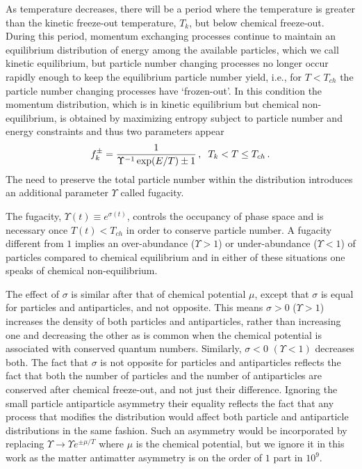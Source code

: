 As temperature decreases, there will be a period where the temperature is greater than the kinetic freeze-out temperature, $T_k$, but below chemical freeze-out. During this period, momentum exchanging processes continue to maintain an equilibrium distribution of energy among the available particles, which we call kinetic equilibrium, but particle number changing processes no longer occur rapidly enough to keep the equilibrium particle number yield, i.e., for $T<T_{ch}$ the particle number changing processes have `frozen-out'. In this condition the momentum distribution, which is in kinetic equilibrium but chemical non-equilibrium, is obtained by maximizing  entropy subject to  particle number and energy constraints and thus two parameters appear
\begin{equation}\label{k_eq}
f_{k}^\pm=\frac{1}{\Upsilon^{-1} \exp(E/T)\pm 1}\,,\hspace{2mm} T_k<T\leq T_{ch}\,.
\end{equation}
The need to preserve the total particle number within the distribution introduces an additional parameter $\Upsilon$ called fugacity. 

The fugacity, $\Upsilon(t)\equiv e^{\sigma(t)}$, controls the occupancy of phase space and is necessary once $T(t)<T_{ch}$ in order to conserve particle number.  A fugacity different from $1$ implies an over-abundance ($\Upsilon>1$) or under-abundance ($\Upsilon<1$) of particles compared to chemical equilibrium and in either of these  situations one speaks of chemical non-equilibrium. 

The effect of $\sigma$ is similar after that of chemical potential $\mu$, except that $\sigma$ is equal for particles and antiparticles, and not opposite. This means $\sigma>0$ ($\Upsilon>1$) increases the density of both particles and antiparticles, rather than increasing one and decreasing the other as is common when the chemical potential is associated with conserved quantum numbers.  Similarly, $\sigma<0$ $(\Upsilon<1)$ decreases both. The fact that $\sigma$ is not opposite for particles and antiparticles reflects the fact that both  the number of particles and the number of antiparticles are conserved after chemical freeze-out, and not just their difference.  Ignoring the small particle antiparticle asymmetry their equality reflects the fact that any process that modifies  the distribution would affect both particle and antiparticle distributions in the same fashion.   Such an asymmetry would be incorporated by replacing $\Upsilon\rightarrow \Upsilon e^{\pm\mu/T}$ where $\mu$ is the chemical potential, but we ignore it in this work as the matter antimatter asymmetry is on the order of $1$ part in $10^9$.

